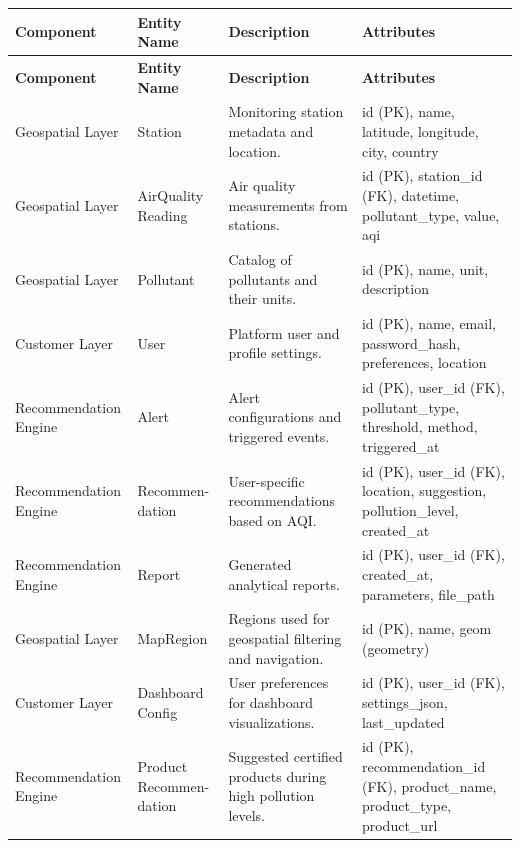 \begin{longtable}{|p{3cm}|p{2cm}|p{6cm}|p{4cm}|}
\hline
\textbf{Component} & \textbf{Entity Name} & \textbf{Description} & \textbf{Attributes} \\
\hline
\endfirsthead

\hline
\textbf{Component} & \textbf{Entity Name} & \textbf{Description} & \textbf{Attributes} \\
\hline
\endhead

Geospatial Layer & Station & Monitoring station metadata and location. & id (PK), name, latitude, longitude, city, country \\
\hline

Geospatial Layer & AirQuality Reading & Air quality measurements from stations. & id (PK), station\_id (FK), datetime, pollutant\_type, value, aqi \\ 
\hline

Geospatial Layer & Pollutant & Catalog of pollutants and their units. & id (PK), name, unit, description \\ 
\hline

Customer Layer & User & Platform user and profile settings. & id (PK), name, email, password\_hash, preferences, location \\ 
\hline

Recommendation Engine & Alert & Alert configurations and triggered events. & id (PK), user\_id (FK), pollutant\_type, threshold, method, triggered\_at \\ 
\hline

Recommendation Engine & Recommen- dation & User-specific recommendations based on AQI. & id (PK), user\_id (FK), location, suggestion, pollution\_level, created\_at \\ 
\hline

Recommendation Engine & Report & Generated analytical reports. & id (PK), user\_id (FK), created\_at, parameters, file\_path \\ 
\hline

Geospatial Layer & MapRegion & Regions used for geospatial filtering and navigation. & id (PK), name, geom (geometry) \\ 
\hline

Customer Layer & Dashboard Config & User preferences for dashboard visualizations. & id (PK), user\_id (FK), settings\_json, last\_updated \\ 
\hline

Recommendation Engine & Product Recommen- dation & Suggested certified products during high pollution levels. & id (PK), recommendation\_id (FK), product\_name, product\_type, product\_url \\ 
\hline


\end{longtable}
